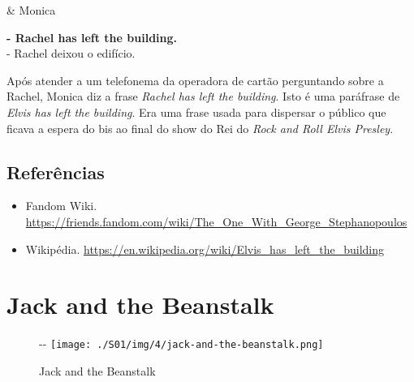 \begin{tcolorbox}[enhanced,center upper,
    drop fuzzy shadow southeast, boxrule=0.3pt,
    lower separated=false,
    colframe=black!30!dialogoBorder,colback=white]
\begin{minipage}[c]{0.14\linewidth}
   & \centering \scriptsize{Monica}
\end{minipage}
\hspace{.1mm}
\begin{minipage}[c]{0.8\linewidth}
  \textbf{- Rachel has left the building.}\\
  - Rachel deixou o edifício.
\end{minipage}
\end{tcolorbox}

Após atender a um telefonema da operadora de cartão perguntando sobre a
Rachel, Monica diz a frase \emph{Rachel has left the building}. Isto é
uma paráfrase de \emph{Elvis has left the building}. Era uma frase usada
para dispersar o público que ficava a espera do bis ao final do show do
Rei do \emph{Rock and Roll Elvis Presley}.

\hypertarget{referuxeancias-1}{%
\subsection{Referências}\label{referuxeancias-1}}

\begin{itemize}
\tightlist
\item
  \sloppy Fandom Wiki. \url{https://friends.fandom.com/wiki/The_One_With_George_Stephanopoulos}
\item
  \sloppy Wikipédia. \url{https://en.wikipedia.org/wiki/Elvis_has_left_the_building}
\end{itemize}

\hypertarget{jack-and-the-beanstalk}{%
\section{Jack and the Beanstalk}\label{jack-and-the-beanstalk}}

\begin{figure}[!ht]
  \begin{adjustwidth}{-\oddsidemargin-1in}{-\rightmargin}
    \centering
    \texttt{[image: ./S01/img/4/jack-and-the-beanstalk.png]}
    \caption{Jack and the Beanstalk\label{fig:jack-and-the-beanstalk}}
  \end{adjustwidth}
\end{figure}

